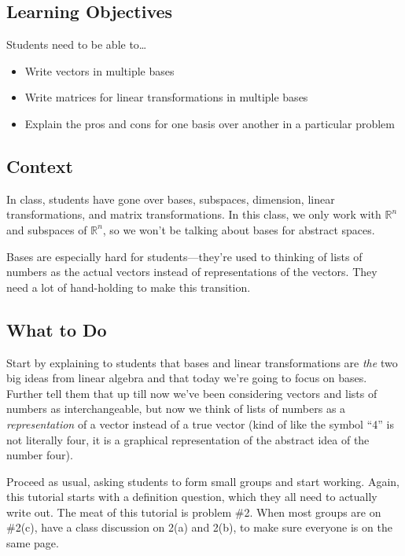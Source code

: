 \documentclass[red]{tutorial}
\newcommand{\R}{\mathbb{R}}
\theoremstyle{definition}
\theoremstyle{theorem}
\begin{document}
	\begin{instructions}

\subsection*{Learning Objectives}
	Students need to be able to\ldots
	\begin{itemize}
		\item Write vectors in multiple bases
		\item Write matrices for linear transformations in multiple bases
		\item Explain the pros and cons for one basis over another in a particular problem
	\end{itemize}

\subsection*{Context}
	In class, students have gone over bases, subspaces, dimension, linear transformations, and
		matrix transformations. In this class, we only work with $\R^n$ and subspaces of $\R^n$,
		so we won't be talking about bases for abstract spaces. 
	
	Bases are especially hard for students---they're used to thinking of lists of numbers
		as the actual vectors instead of representations of the vectors. They need
		a lot of hand-holding to make this transition.

\subsection*{What to Do}
	Start by explaining to students that bases and linear transformations are \emph{the}
		two big ideas from linear algebra and that today we're going to focus on bases.
		Further tell them that up till now we've been considering vectors and lists
		of numbers as interchangeable, but now we think of lists of numbers
		as a \emph{representation} of a vector instead of a true vector (kind of like
		the symbol ``4'' is not literally four, it is a graphical representation of
		the abstract idea of the number four).
	
	Proceed as usual, asking students to form small groups and start working.
		Again, this tutorial starts with a definition question, which they all need to actually write out.
		The meat of this tutorial is problem \#2.
		When most groups are on \#2(c), have a class discussion on 2(a) and 2(b), to
		make sure everyone is on the same page.



\end{instructions}
\end{document}
